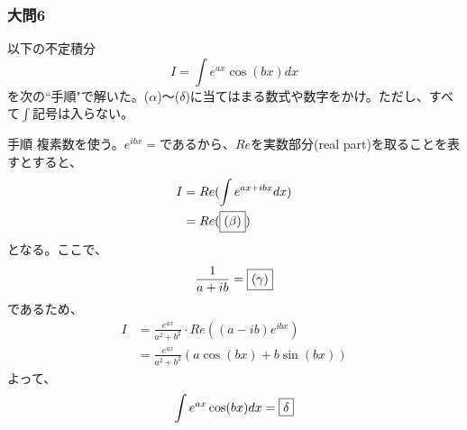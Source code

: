 \documentclass[a4j,dvipdfmx]{jsarticle}
\begin{document}
    \subsubsection*{大問6}
    以下の不定積分
    \begin{equation*}
        I=\int e^{ax}\cos(bx)dx
    \end{equation*}
    を次の``手順"で解いた。($\alpha$)～($\delta$)に当てはまる数式や数字をかけ。ただし、すべて$\int$記号は入らない。
    \begin{itembox}{手順}
        複素数を使う。$e^{ibx}=$\fbox{$(\alpha)$}であるから、$Re$を実数部分(real part)を取ることを表すとすると、
        \begin{align*}
            I&=Re(\int e^{ax+ibx}dx)\\
             &=Re(\fbox{($\beta$)})
        \end{align*}
        となる。ここで、
        \begin{equation*}
            \frac{1}{a+ib}=\fbox{$(\gamma)$}
        \end{equation*}
        であるため、
        \begin{align*}
            I&=\frac{e^{ax}}{a^2+b^2}\cdot Re((a-ib)e^{ibx})\\
             &=\frac{e^{ax}}{a^2+b^2}(a\cos(bx)+b\sin(bx))
        \end{align*}
        よって、
        \begin{equation*}
            \int e^{ax}\cos(bx)dx=\fbox{$\delta$}
        \end{equation*}
    \end{itembox}
    \\
\end{document}
